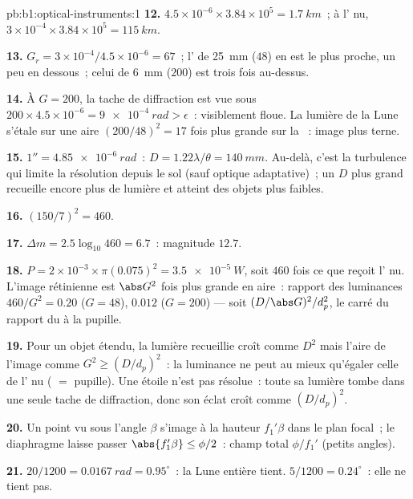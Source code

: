 \begin{solution}{pb:b1:optical-instruments:1}
\textbf{12.} $4.5\times10^{-6} \times 3.84\times10^5 = \qty{1.7}{km}$~;
à l' nu, $3\times10^{-4} \times 3.84\times10^5 = \qty{115}{km}$.

\textbf{13.} $G_r = 3\times10^{-4}/4.5\times10^{-6} = 67$~; l' de \qty{25}{mm}
($48$) en est le plus proche, un peu en dessous~; celui de \qty{6}{mm}
($200$) est trois fois au-dessus.

\textbf{14.} À $G = 200$, la tache de diffraction est vue sous $200 \times 4.5
\times10^{-6} = \qty{9e-4}{rad} > \epsilon$~: visiblement floue. La
lumière de la Lune s'étale sur une aire $(200/48)^2 = 17$ fois plus
grande sur la ~: image plus terne.

\textbf{15.} $1'' = \qty{4.85e-6}{rad}$~: $D = 1.22\lambda/\theta =
\qty{140}{mm}$. Au-delà, c'est la turbulence qui limite la résolution
depuis le sol (sauf optique adaptative)~; un $D$ plus grand recueille
encore plus de lumière et atteint des objets plus faibles.

\textbf{16.} $(150/7)^2 = 460$.

\textbf{17.} $\Delta m = 2.5\log_{10}460 = 6.7$~: magnitude $12.7$.

\textbf{18.} $P = 2\times10^{-3} \times \pi(0.075)^2 = \qty{3.5e-5}{W}$,
soit $460$ fois ce que reçoit l' nu. L'image rétinienne est $\abs G^2$
fois plus grande en aire~: rapport des luminances $460/G^2 = 0.20$
($G = 48$), $0.012$ ($G = 200$) --- soit $(D/\abs G)^2/d_p^2$, le carré
du rapport du  à la pupille.

\textbf{19.} Pour un objet étendu, la lumière recueillie croît comme
$D^2$ mais l'aire de l'image comme $G^2 \geq (D/d_p)^2$~: la luminance
ne peut au mieux qu'égaler celle de l' nu ( $=$
pupille). Une étoile n'est pas résolue~: toute sa lumière tombe dans une
seule tache de diffraction, donc son éclat croît comme $(D/d_p)^2$.

\textbf{20.} Un point vu sous l'angle $\beta$ s'image à la hauteur
$f_1'\beta$ dans le plan focal~; le diaphragme laisse passer
$\abs{f_1'\beta} \leq \phi/2$~: champ total $\phi/f_1'$ (petits angles).

\textbf{21.} $20/1200 = \qty{0.0167}{rad} = 0.95^\circ$~: la Lune entière
tient. $5/1200 = 0.24^\circ$~: elle ne tient pas.


\end{solution}
